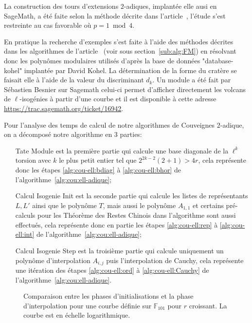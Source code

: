 \documentclass[10pt,a4paper]{book}
\theoremstyle{plain}
\theoremstyle{definition}
\theoremstyle{definition}
\theoremstyle{definition}
\theoremstyle{definition}
\theoremstyle{remark}
\theoremstyle{remark}
\theoremstyle{definition}
\begin{document}
La construction des tours d'extensions $2$-adiques, implantée elle ausi en 
SageMath, a été faite selon la méthode
décrite dans l'article~\cite{Doliskani-Schost15}, l'étude s'est restreinte au 
cas favorable où $p=1 \bmod 4$.

En pratique la recherche d'exemples s'est faite à l'aide des méthodes décrites
dans les algorithmes de l'article~\cite{FouquetMorain02} (voir sous section~\ref{sub:alg:FM}) en résolvant donc les
polynômes modulaires utilisés d'après la base de données "database-kohel" 
implantée par David Kohel. La détermination de la forme du cratère se faisait 
elle à l'aide de la valeur du discriminant $d_k$. Un module a été fait par 
Sébastien Besnier sur Sagemath celui-ci permet d'afficher directement les 
volcans de $\ell$-isogénies à partir d'une courbe et il est disponible à cette 
adresse \url{https://trac.sagemath.org/ticket/16942}. 

Pour l'analyse des temps de calcul de notre algorithmes de Couveignes 
$2$-adique, on a décomposé notre algorithme en 3 parties:
\begin{enumerate}
\item[Tate Module] est la première partie qui calcule une base diagonale de la 
$\ell^k$ torsion avec $k$ le plus petit entier tel que $2^{2k-2}(2+1)> 4r$,
cela représente donc les étapes \ref{alg:cou-ell:bdiag} à \ref{alg:cou-ell:bhor} de l'algorithme~\ref{alg:cou:ell-adique};
\item[Calcul Isogenie Init] est la seconde partie qui calcule les listes de 
représentants $L,L'$ ainsi que le polynôme $T$, mais aussi le polynôme 
$A_{1,1}$ et certains pré-calculs pour les Théorème des Restes Chinois dans 
l'algorithme sont aussi effectués, cela représente donc en partie les étapes 
\ref{alg:cou-ell:rep} à \ref{alg:cou-ell:int} de 
l'algorithme~\ref{alg:cou:ell-adique};
\item[Calcul Isogenie Step] est la troisième partie qui calcule uniquement 
un polynôme d'interpolation $A_{i,j}$ puis l'interpolation de 
Cauchy, cela représente une itération des étapes \ref{alg:cou-ell:ord} à 
\ref{alg:cou-ell:Cauchy} de l'algorithme~\ref{alg:cou:ell-adique}.
\end{enumerate}


\begin{figure}
\label{fig:exp:uni}
\caption{Comparaison entre les phases d'initialisations et la phase d'interpolation pour une courbe définie sur $\mathbb{F}_{101}$ pour $r$ croissant. La courbe est en échelle logarithmique.}
\end{figure}
\end{document}
